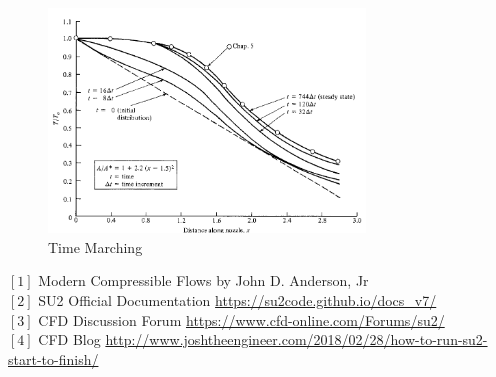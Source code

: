 \documentclass[12pt,a4paper]{article}
\begin{document}
\begin{figure}[H]
    \centering
    \includegraphics[width=0.75\textwidth]{text/time marching.PNG}
    \caption{Time Marching}
    \label{fig:Time Marching}
\end{figure}


\newpage




$[1]$ Modern Compressible Flows by John D. Anderson, Jr\\
$[2]$ SU2 Official Documentation \url{https://su2code.github.io/docs_v7/}\\
$[3]$ CFD Discussion Forum \url{https://www.cfd-online.com/Forums/su2/}\\
$[4]$ CFD Blog \url{http://www.joshtheengineer.com/2018/02/28/how-to-run-su2-start-to-finish/}
\end{document}
